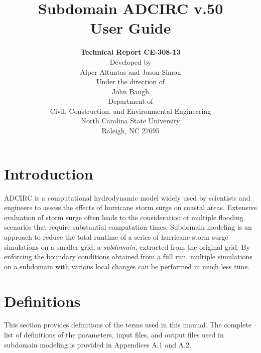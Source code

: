 \documentclass[11pt,titlepage]{article}
\title{\bf Subdomain ADCIRC v.50 \\[3pt] User Guide}
\author{{\bf Technical Report CE-308-13} \\[60pt]
Developed by \\
Alper Altuntas and Jason Simon \\[40pt]
Under the direction of \\
John Baugh \\[40pt]
Department of \\
Civil, Construction, and Environmental Engineering \\
North Carolina State University \\
Raleigh, NC 27695 \\[50pt]}
\begin{document}
\maketitle
\tableofcontents
\setcounter{page}{2}

\newpage


\section{Introduction}

ADCIRC is a computational hydrodynamic model widely used by scientists
and engineers to assess the effects of hurricane storm surge on
coastal areas. Extensive evaluation of storm surge often leads to the
consideration of multiple flooding scenarios that require substantial
computation times. Subdomain modeling is an approach to reduce the
total runtime of a series of hurricane storm surge simulations on a
smaller grid, a \emph{subdomain}, extracted from the original grid. By
enforcing the boundary conditions obtained from a full run, multiple
simulations on a subdomain with various local changes can be performed
in much less time.

\section{Definitions}

This section provides definitions of the terms used in this
manual. The complete list of definitions of the parameters, input
files, and output files used in subdomain modeling is provided in
Appendices A.1 and A.2.
\end{document}
